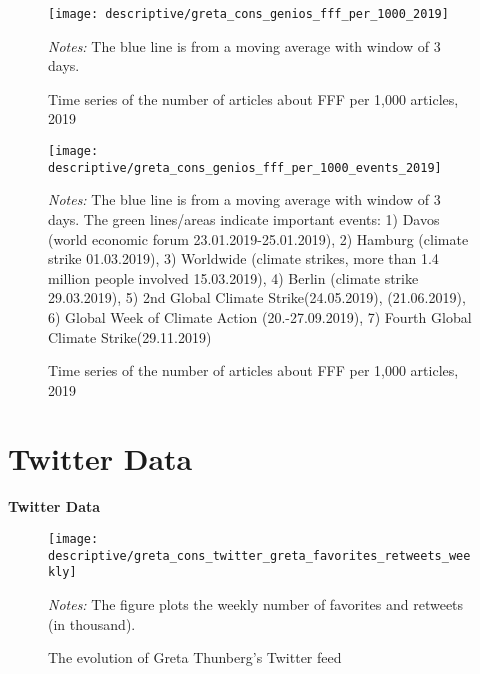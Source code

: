 \documentclass[11pt, a4paper]{article} %
\begin{document}
\begin{figure}[H]\centering
	\caption{Time series of the number of articles about FFF per 1,000 articles, 2019}
	\texttt{[image: descriptive/greta\_cons\_genios\_fff\_per\_1000\_2019]}
	\begin{minipage}{\linewidth}
		\scriptsize{\emph{Notes:} The blue line is from a moving average with window of 3 days.}
	\end{minipage}
\end{figure}


\begin{figure}[H]\centering
	\caption{Time series of the number of articles about FFF per 1,000 articles, 2019}
	\texttt{[image: descriptive/greta\_cons\_genios\_fff\_per\_1000\_events\_2019]}
	\begin{minipage}{\linewidth}
		\scriptsize{\emph{Notes:} The blue line is from a moving average with window of 3 days. The green lines/areas indicate important events: 1) Davos (world economic forum 23.01.2019-25.01.2019), 2) Hamburg (climate strike 01.03.2019), 3) Worldwide (climate strikes, more than 1.4 million people involved 15.03.2019), 4) Berlin (climate strike 29.03.2019), 5) 2nd Global Climate Strike(24.05.2019), (21.06.2019), 6) Global Week of Climate Action (20.-27.09.2019), 7) Fourth Global Climate Strike(29.11.2019)}
	\end{minipage}
\end{figure}



\newpage
\TODO\section{Twitter Data}
\vspace*{\fill}
{\Huge \begin{center}\textbf{Twitter Data}\end{center}}
\vspace*{\fill}\clearpage

\begin{figure}[H]\centering
	\caption{The evolution of Greta Thunberg's Twitter feed}
	\texttt{[image: descriptive/greta\_cons\_twitter\_greta\_favorites\_retweets\_weekly]}
	\begin{minipage}{\linewidth}
		\scriptsize{\emph{Notes:} The figure plots the weekly number of favorites and retweets (in thousand).}
	\end{minipage}
\end{figure}
\end{document}
